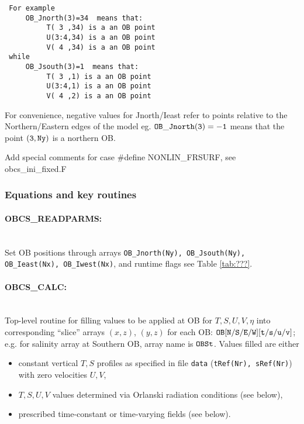 \begin{verbatim}
 For example
     OB_Jnorth(3)=34  means that:
          T( 3 ,34) is a an OB point
          U(3:4,34) is a an OB point
          V( 4 ,34) is a an OB point
 while
     OB_Jsouth(3)=1  means that:
          T( 3 ,1) is a an OB point
          U(3:4,1) is a an OB point
          V( 4 ,2) is a an OB point
\end{verbatim}

For convenience, negative values for Jnorth/Ieast refer to
points relative to the Northern/Eastern edges of the model
eg. $\tt OB\_Jnorth(3)=-1$  means that the point $\tt (3,Ny)$ 
is a northern OB.

\noindent
\textsf{Add special comments for case \#define NONLIN\_FRSURF,
see obcs\_ini\_fixed.F}


\subsubsection{Equations and key routines
\label{sec:pkg:obcs:equations}}

\paragraph{OBCS\_READPARMS:} ~ \\
Set OB positions through arrays
{\tt OB\_Jnorth(Ny), OB\_Jsouth(Ny), OB\_Ieast(Nx), OB\_Iwest(Nx)},
and runtime flags see Table \ref{tab:???}.

\paragraph{OBCS\_CALC:} ~ \\
%
Top-level routine for filling values to be applied at OB for 
$T,S,U,V,\eta$ into corresponding 
``slice'' arrays $(x,z)$, $(y,z)$ for each OB:
$\tt OB[N/S/E/W][t/s/u/v]$; e.g. for salinity array at
Southern OB, array name is $\tt OBSt$.
Values filled are either
%
\begin{itemize}
%
\item
constant vertical $T,S$ profiles as specified in file
{\tt data} ({\tt tRef(Nr), sRef(Nr)}) with zero velocities $U,V$,
%
\item
$T,S,U,V$ values determined via Orlanski radiation conditions
(see below),
%
\item
prescribed time-constant or time-varying fields (see below).
%
\end{itemize}


